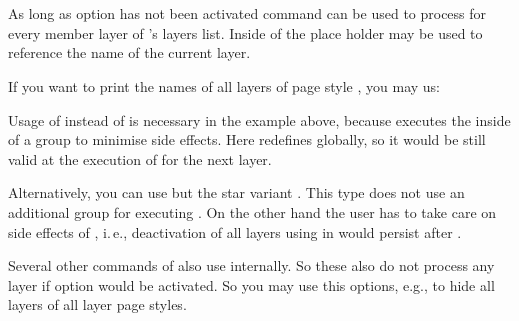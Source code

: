 \begin{Declaration}
  \\
  \\
\end{Declaration}
%
%
%
As long as \KOMAScript{} option  has not
been activated command  can be used to process
 for every member layer of 's layers
list. Inside of  the place holder  may be used to
reference the name of the current layer.
\begin{Example}
  If you want to print the names of all layers of page style
  , you may us:
\begin{lstcode}
  \let\commaatlist\empty
  \ForEachLayerOfPageStyle{scrheadings}{%
    \commaatlist#1\gdef\commaatlist{, }}
\end{lstcode}
\end{Example}
Usage of  instead of  is necessary in the example
above, because  executes the 
inside of a group to minimise side effects. Here  redefines
 globally, so it would be still valid at the execution of
 for the next layer.

Alternatively, you can use 
but the star variant . This type does not use
an additional group for executing . On the other hand the user has
to take care on side effects of , i.\,e., deactivation of all
layers using  in 
would persist after .

Several other commands of  also
use  internally. So these also do not process
any layer if \KOMAScript{} option  would be
activated. So you may use this options, e.g., to hide all layers of all layer
page styles.%
%
%
%

